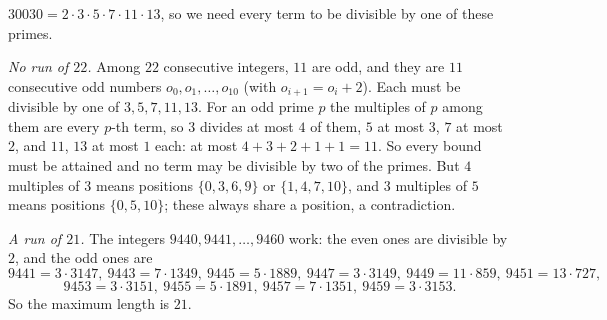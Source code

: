 $30030=2\cdot3\cdot5\cdot7\cdot11\cdot13$, so we need every term to be divisible by one of these primes.

\emph{No run of $22$.} Among $22$ consecutive integers, $11$ are odd, and they are $11$ consecutive odd numbers $o_0,o_1,\dots,o_{10}$ (with $o_{i+1}=o_i+2$). Each must be divisible by one of $3,5,7,11,13$. For an odd prime $p$ the multiples of $p$ among them are every $p$-th term, so $3$ divides at most $4$ of them, $5$ at most $3$, $7$ at most $2$, and $11$, $13$ at most $1$ each: at most $4+3+2+1+1=11$. So every bound must be attained and no term may be divisible by two of the primes. But $4$ multiples of $3$ means positions $\{0,3,6,9\}$ or $\{1,4,7,10\}$, and $3$ multiples of $5$ means positions $\{0,5,10\}$; these always share a position, a contradiction.

\emph{A run of $21$.} The integers $9440,9441,\dots,9460$ work: the even ones are divisible by $2$, and the odd ones are
\[9441=3\cdot3147,\ 9443=7\cdot1349,\ 9445=5\cdot1889,\ 9447=3\cdot3149,\ 9449=11\cdot859,\ 9451=13\cdot727,\]
\[9453=3\cdot3151,\ 9455=5\cdot1891,\ 9457=7\cdot1351,\ 9459=3\cdot3153.\]
So the maximum length is $\boxed{21}$.
